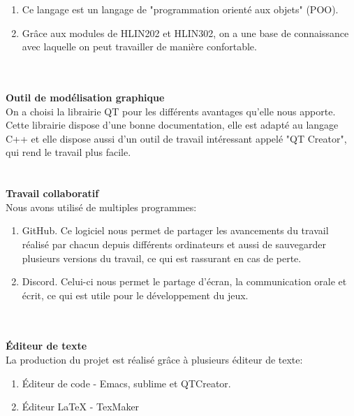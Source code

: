 \documentclass{article}
\begin{document}
\begin{enumerate}
\item Ce langage est un langage de "programmation orienté aux objets" (POO).
\item Grâce aux modules de HLIN202 et HLIN302, on a une base de connaissance avec laquelle on peut travailler de manière confortable.
\end{enumerate}
~\\~\\
\textbf{\large Outil de modélisation graphique}\\
On a choisi la librairie QT pour les différents avantages qu'elle nous apporte. Cette librairie dispose d'une bonne documentation, elle est adapté au langage C++ et elle dispose aussi d'un outil de travail intéressant appelé "QT Creator", qui rend le travail plus facile.\\~\\~\\
\textbf{\large Travail collaboratif}\\
Nous avons utilisé de multiples programmes:
\begin{enumerate}
\item GitHub. Ce logiciel nous permet de partager les avancements du travail réalisé par chacun depuis différents ordinateurs et aussi de sauvegarder plusieurs versions du travail, ce qui est rassurant en cas de perte.
\item Discord. Celui-ci nous permet le partage d'écran, la communication orale et écrit, ce qui est utile pour le développement du jeux.
\end{enumerate}
~\\~\\
\textbf{\large Éditeur de texte}\\
La production du projet est réalisé grâce à plusieurs éditeur de texte:
\begin{enumerate}
\item Éditeur de code -
Emacs, sublime et QTCreator.
\item Éditeur \LaTeX{} - TexMaker
\end{enumerate} 
\newpage
\end{document}
